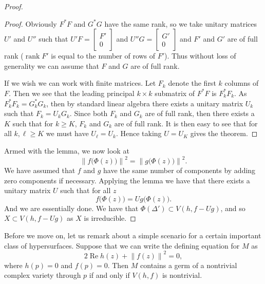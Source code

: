 \documentclass[12pt,openany]{book}
\renewcommand{\Re}{\operatorname{Re}}
\newcommand{\norm}[1]{\left\lVert {#1} \right\rVert}
\newcommand{\rank}{\operatorname{rank}}
\theoremstyle{plain}
\theoremstyle{remark}
\theoremstyle{definition}
\theoremstyle{exercise}
\theoremstyle{example}
\begin{document}
\begin{proof}
\begin{proof}
Obviously $F^*F$ and $G^*G$ have the same rank, so we take unitary
matrices $U'$ and $U''$ such that
$U'F = \left[\begin{smallmatrix} F' \\ 0 \end{smallmatrix}\right]$
and
$U''G = \left[\begin{smallmatrix} G' \\ 0 \end{smallmatrix}\right]$
and
$F'$ and $G'$ are of full rank ($\rank F'$ is equal to the number of rows of
$F'$).  Thus without loss of generality we can assume that $F$ and $G$
are of full rank.

If we wish we can work with finite matrices.  Let $F_k$ denote the first $k$
columns of $F$.  Then we see that the leading principal $k \times k$
submatrix of $F^*F$ is $F_k^*F_k$.  As 
$F_k^*F_k = G_k^* G_k$, then by standard linear algebra there exists
a unitary matrix $U_k$ such that
$F_k = U_k G_k$.  Since both $F_k$ and $G_k$ are of full rank, then
there exists a $K$ such that for $k \geq K$, $F_k$ and $G_k$ are of full
rank.  It is then easy to see that for all $k,\ell \geq K$ we must have
$U_\ell = U_k$.  Hence taking $U = U_K$ gives the theorem.
\end{proof}

Armed with the lemma, we now look at
\begin{equation}
\norm{f\bigl(\Phi(z)\bigr)}^2 = \norm{g\bigl(\Phi(z)\bigr)}^2 .
\end{equation}
We have assumed that $f$ and $g$ have the same number of components
by adding zero components if necessary.
Applying the lemma we have that there exists
a unitary matrix $U$ such that for all $z$
\begin{equation}
f\bigl(\Phi(z)\bigr) = U g\bigl(\Phi(z)\bigr) .
\end{equation}
And we are essentially done.  We have that $\Phi(\Delta') \subset
V(h,f-Ug)$, and so $X \subset V(h,f-Ug)$ as $X$ is irreducible.
\end{proof}

Before we move on, let us remark about a simple scenario for a certain
important class of hypersurfaces.  Suppose that we can write the defining
equation for $M$ as
\begin{equation}
2 \Re h(z) + \norm{f(z)}^2 = 0 ,
\end{equation}
where $h(p) = 0$ and $f(p) = 0$.  Then $M$ contains a germ of a nontrivial
complex variety through $p$ if and only if $V(h,f)$ is nontrivial.
\end{document}
